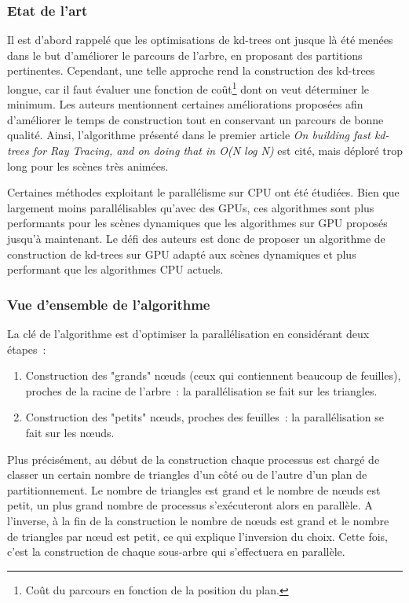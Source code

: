 \documentclass[a4paper]{article}
\begin{document}
\subsubsection{Etat de l'art}
Il est d'abord rappelé que les optimisations de kd-trees ont jusque là été menées dans le but d'améliorer le parcours de l'arbre, en proposant des partitions pertinentes. Cependant, une telle approche rend la construction des kd-trees longue, car il faut évaluer une fonction de coût\footnote{Coût du parcours en fonction de la position du plan.} dont on veut déterminer le minimum. Les auteurs mentionnent certaines améliorations proposées afin d'améliorer le temps de construction tout en conservant un parcours de bonne qualité. Ainsi, l'algorithme présenté dans le premier article \textit{On building fast kd-trees for Ray Tracing, and on doing that in O(N log N)} est cité, mais déploré trop long pour les scènes très animées.

Certaines méthodes exploitant le parallélisme sur CPU ont été étudiées. Bien que largement moins parallélisables qu'avec des GPUs, ces algorithmes sont plus performants pour les scènes dynamiques que les algorithmes sur GPU proposés jusqu'à maintenant. Le défi des auteurs est donc de proposer un algorithme de construction de kd-trees sur GPU adapté aux scènes dynamiques et plus performant que les algorithmes CPU actuels.

\subsubsection{Vue d'ensemble de l'algorithme}

La clé de l'algorithme est d'optimiser la parallélisation en considérant deux étapes~:
\begin{enumerate}
	\item Construction des "grands" nœuds (ceux qui contiennent beaucoup de feuilles), proches de la racine de l'arbre~: la parallélisation se fait sur les triangles.
	\item Construction des "petits" nœuds, proches des feuilles~: la parallélisation se fait sur les nœuds.
\end{enumerate}
Plus précisément, au début de la construction chaque processus est chargé de classer un certain nombre de triangles d'un côté ou de l'autre d'un plan de partitionnement. Le nombre de triangles est grand et le nombre de nœuds est petit, un plus grand nombre de processus s’exécuteront alors en parallèle. A l'inverse, à la fin de la construction le nombre de nœuds est grand et le nombre de triangles par nœud est petit, ce qui explique l'inversion du choix. Cette fois, c'est la construction de chaque sous-arbre qui s'effectuera en parallèle.
\end{document}
